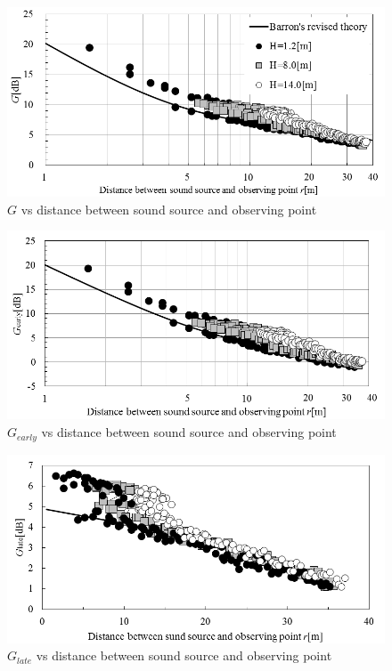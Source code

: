 \begin{figure}[htbp]
    \centering
    \includegraphics[keepaspectratio,scale=1]{04_att/G_Barron.png}
    \caption{\hspace{1mm}$G$ vs distance between sound source and observing point}
    \label{fig:G_Barron}
\end{figure}

\begin{figure}[htbp]
    \centering
    \includegraphics[keepaspectratio,scale=1]{04_att/Ge_Barron.png}
    \caption{\hspace{1mm}$G_{early}$ vs distance between sound source and observing point}
    \label{fig:Ge_Barron}
\end{figure}

\begin{figure}[htbp]
    \centering
    \includegraphics[keepaspectratio,scale=1]{04_att/Gl_Barron.png}
    \caption{\hspace{1mm}$G_{late}$ vs distance between sound source and observing point}
    \label{fig:Gl_Barron}
\end{figure}

